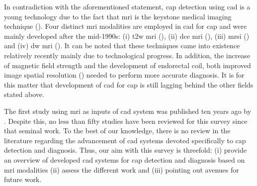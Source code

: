 
In contradiction with the aforementioned statement, \ac{cap} detection using \acs{cad} is a young technology due to the fact that \ac{mri} is the keystone medical imaging technique (\cite{Hegde2013}). Four distinct \ac{mri} modalities are employed in \acs{cad} for \ac{cap} and were mainly developed after the mid-1990s: (i) \ac{t2w} \ac{mri} (\cite{Hricak1983}), (ii) \ac{dce} \ac{mri} (\cite{HuchBoni1995}), (iii) \ac{mrsi} (\cite{Kurhanewicz1996}) and (iv) \ac{dw} \ac{mri} (\cite{Scheidler1999}). It can be noted that these techniques came into existence relatively recently mainly due to technological progress. In addition, the increase of magnetic field strength and the development of endorectal coil, both improved image spatial resolution (\cite{Swanson2001}) needed to perform more accurate diagnosis. It is for this matter that development of \acs{cad} for \ac{cap} is still lagging behind the other fields stated above.

The first study using \ac{mri} as inputs of \acs{cad} system was published ten years ago by \cite{Chan2003}. Despite this, no less than fifty studies have been reviewed for this survey since that seminal work. To the best of our knowledge, there is no review in the literature regarding the advancement of \acs{cad} systems devoted specifically to \ac{cap} detection and diagnosis. Thus, our aim with this survey is threefold: (i) provide an overview of developed \acs{cad} systems for \ac{cap} detection and diagnosis based on \ac{mri} modalities (ii) assess the different work and (iii) pointing out avenues for future work.

